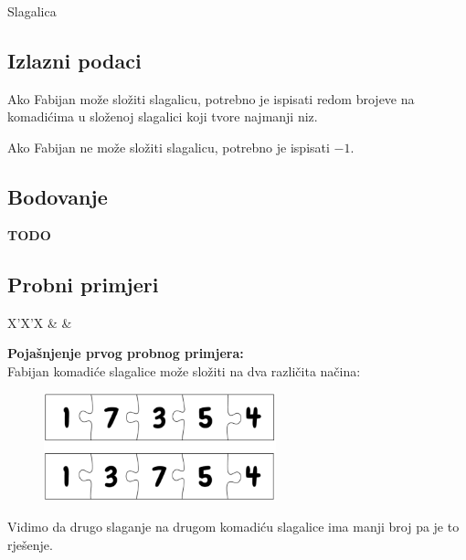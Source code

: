 \begin{statement}[
  problempoints=70,
  timelimit=1 sekunda,
  memorylimit=512 MiB,
]{Slagalica}
\subsection*{Izlazni podaci}
Ako Fabijan može složiti slagalicu, potrebno je ispisati redom brojeve na
komadićima u složenoj slagalici koji tvore najmanji niz.

Ako Fabijan ne može složiti slagalicu, potrebno je ispisati $-1$.

\subsection*{Bodovanje}
\textbf{TODO}

\subsection*{Probni primjeri}
\begin{tabularx}{\textwidth}{X'X'X}
 &
 &
\end{tabularx}

\textbf{Pojašnjenje prvog probnog primjera:}\\
Fabijan komadiće slagalice može složiti na dva različita načina:

\begin{figure}[H]
\centering
\includegraphics[width=0.6\textwidth]{img/sample_clarification.png}
\end{figure}
Vidimo da drugo slaganje na drugom komadiću slagalice ima manji broj pa je to
rješenje.

\end{statement}

